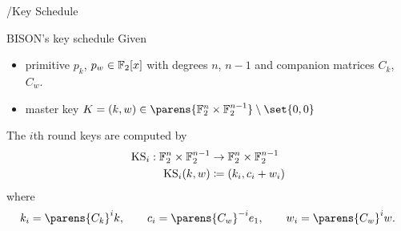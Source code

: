 \begin{frame}{\bison/}{Key Schedule\vpPp}
    \vspace{-45pt}
    \begin{minipage}[t][150pt][t]{0.985\textwidth}
        \begin{block}{BISON's key schedule}
            \vspace{0.5\baselineskip}
            Given
            \begin{itemize}
                \item primitive $p_k$, $p_w \in \mathbb{F}_2[x]$ with degrees $n$, $n-1$ and companion matrices $C_k$, $C_w$.
                \item master key $K = (k, w) \in \parens{\F_2^n \times \F_2^{n-1}} \setminus \set{0,0}$
            \end{itemize}
            The $i$th round keys are computed by
            \begin{align*}
                \mathrm{KS}_i : \mathbb{F}_2^n \times \mathbb{F}_2^{n-1} &\to \mathbb{F}_2^n \times \mathbb{F}_2^{n-1} \\
                \mathrm{KS}_i(k, w) &\coloneqq (k_i, c_i + w_i)
            \end{align*}
            where \begin{equation*}
                    k_i = \parens{C_k}^i k, \qquad
                    c_i = \parens{C_w}^{-i} e_1, \qquad
                    w_i = \parens{C_w}^i w.
                \end{equation*}
        \end{block}
    \end{minipage}
\end{frame}

